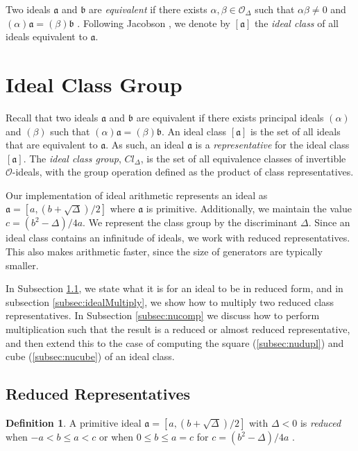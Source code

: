 \documentclass{ucalgthes1}
\theoremstyle{definition}
\newtheorem{defn}[thm]{Definition}
\newcommand{\OO}{\mathcal{O}}
\begin{document}
Two ideals $\mathfrak a$ and $\mathfrak b$ are \emph{equivalent} if there exists $\alpha, \beta \in \OO_\Delta$ such that $\alpha \beta \neq 0$ and $(\alpha)\mathfrak a = (\beta) \mathfrak b$ \cite[p.88]{Jacobson2009}. Following Jacobson \cite[p.88]{Jacobson2009}, we denote by $[\mathfrak a]$ the \emph{ideal class} of all ideals equivalent to $\mathfrak a$. 


\bigbreak
\section{Ideal Class Group}

Recall that two ideals $\mathfrak a$ and $\mathfrak b$ are equivalent if there exists principal ideals $(\alpha)$ and $(\beta)$ such that $(\alpha)\mathfrak a = (\beta)\mathfrak b$.  An ideal class $[\mathfrak a]$ is the set of all ideals that are equivalent to $\mathfrak a$. As such, an ideal $\mathfrak a$ is a \emph{representative} for the ideal class $[\mathfrak a]$. The \emph{ideal class group}, $Cl_\Delta$, is the set of all equivalence classes of invertible $\OO$-ideals, with the group operation defined as the product of class representatives.

Our implementation of ideal arithmetic represents an ideal as $\mathfrak a = [a, (b + \sqrt\Delta)/2]$ where $\mathfrak a$ is primitive.  Additionally, we maintain the value $c = (b^2 - \Delta)/4a$.  We represent the class group by the discriminant $\Delta$. Since an ideal class contains an infinitude of ideals, we work with reduced representatives.  This also makes arithmetic faster, since the size of generators are typically smaller.

In Subsection \ref{subsec:reduction}, we state what it is for an ideal to be in reduced form, and in subsection \ref{subsec:idealMultiply}, we show how to multiply two reduced class representatives. In Subsection \ref{subsec:nucomp} we discuss how to perform multiplication such that the result is a reduced or almost reduced representative, and then extend this to the case of computing the square (\ref{subsec:nudupl}) and cube (\ref{subsec:nucube}) of an ideal class.  


\subsection{Reduced Representatives}
\label{subsec:reduction}

\begin{defn}
\label{defn:reducedIdeal}
A primitive ideal $\mathfrak{a} = [a, (b+\sqrt{\Delta})/2]$ with $\Delta < 0$ is \emph{reduced} when $-a < b \le a < c$ or when $0 \le b \le a = c$ for $c = (b^2 - \Delta)/4a$ \cite[p.241]{Crandall2001}.
\end{defn}
\end{document}
